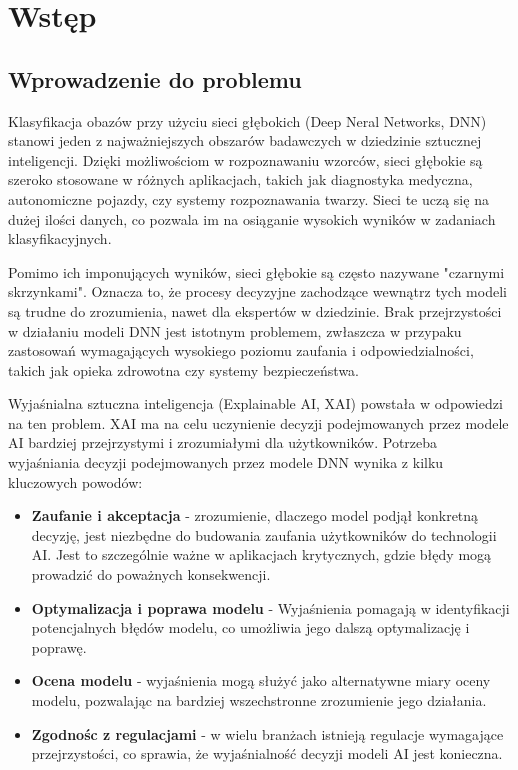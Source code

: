 
\chapter*{Wstęp}

\section*{Wprowadzenie do problemu}
Klasyfikacja obazów przy użyciu sieci głębokich (Deep Neral Networks, DNN) stanowi jeden z najważniejszych obszarów badawczych w dziedzinie sztucznej inteligencji.
Dzięki możliwościom w rozpoznawaniu wzorców, sieci głębokie są szeroko stosowane w różnych aplikacjach, takich jak diagnostyka medyczna, autonomiczne pojazdy, czy systemy rozpoznawania twarzy.
Sieci te uczą się na dużej ilości danych, co pozwala im na osiąganie wysokich wyników w zadaniach klasyfikacyjnych.

Pomimo ich imponujących wyników, sieci głębokie są często nazywane "czarnymi skrzynkami".
Oznacza to, że procesy decyzyjne zachodzące wewnątrz tych modeli są trudne do zrozumienia, nawet dla ekspertów w dziedzinie.
Brak przejrzystości w działaniu modeli DNN jest istotnym problemem, zwłaszcza w przypaku zastosowań wymagających wysokiego poziomu zaufania i odpowiedzialności, takich jak opieka zdrowotna czy systemy bezpieczeństwa.

Wyjaśnialna sztuczna inteligencja (Explainable AI, XAI) powstała w odpowiedzi na ten problem.
XAI ma na celu uczynienie decyzji podejmowanych przez modele AI bardziej przejrzystymi i zrozumiałymi dla użytkowników.
Potrzeba wyjaśniania decyzji podejmowanych przez modele DNN wynika z kilku kluczowych powodów:
\begin{itemize}
	\item \textbf{Zaufanie i akceptacja} - zrozumienie, dlaczego model podjął konkretną decyzję, jest niezbędne do budowania zaufania użytkowników do technologii AI.
	      Jest to szczególnie ważne w aplikacjach krytycznych, gdzie błędy mogą prowadzić do poważnych konsekwencji.
	\item \textbf{Optymalizacja i poprawa modelu} - Wyjaśnienia pomagają w identyfikacji potencjalnych błędów modelu, co umożliwia jego dalszą optymalizację i poprawę.
	\item \textbf{Ocena modelu} - wyjaśnienia mogą służyć jako alternatywne miary oceny modelu, pozwalając na bardziej wszechstronne zrozumienie jego działania.
	\item \textbf{Zgodnośc z regulacjami} - w wielu branżach istnieją regulacje wymagające przejrzystości, co sprawia, że wyjaśnialność decyzji modeli AI jest konieczna.
\end{itemize}


